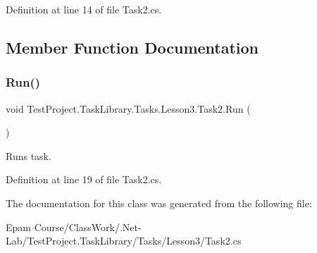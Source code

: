 Definition at line 14 of file Task2.\+cs.



\subsection{Member Function Documentation}
\mbox{\label{class_test_project_1_1_task_library_1_1_tasks_1_1_lesson3_1_1_task2_a04a75929c91222c8c9a1142b0c9e5b3f}} 
\subsubsection{\texorpdfstring{Run()}{Run()}}
{\footnotesize\ttfamily void Test\+Project.\+Task\+Library.\+Tasks.\+Lesson3.\+Task2.\+Run (\begin{DoxyParamCaption}{ }\end{DoxyParamCaption})}



Runs task. 



Definition at line 19 of file Task2.\+cs.



The documentation for this class was generated from the following file\+:\begin{DoxyCompactItemize}
\item 
Epam Course/\+Class\+Work/.\+Net-\/\+Lab/\+Test\+Project.\+Task\+Library/\+Tasks/\+Lesson3/Task2.\+cs\end{DoxyCompactItemize}
